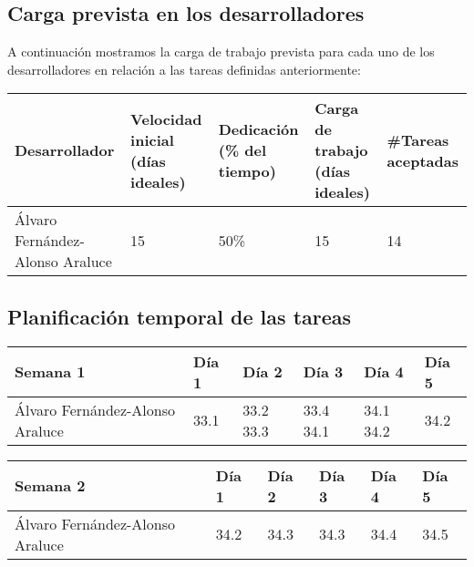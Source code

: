\newpage

\subsection{Carga prevista en los desarrolladores}

A continuación mostramos la carga de trabajo prevista para cada uno de los desarrolladores en relación a las tareas definidas anteriormente:

\begin{table}[h]
	\centering
	\begin{tabular}{| p{3cm} | p{2cm} | p{2cm} | p{2cm} | p{2cm} |}
		\rowcolor[HTML]{329A9D} 
		{\color[HTML]{FFFFFF} \textbf{Desarrollador}} & {\color[HTML]{FFFFFF} \textbf{Velocidad inicial (días ideales)}} & {\color[HTML]{FFFFFF} \textbf{Dedicación (\% del tiempo)}} & {\color[HTML]{FFFFFF} \textbf{Carga de trabajo (días ideales)}} & {\color[HTML]{FFFFFF} \textbf{\#Tareas aceptadas}}  \\ \hline
		Álvaro Fernández-Alonso Araluce & 15 & 50\% & 15 & 14 \\ \hline
	\end{tabular}
\end{table}

\subsection{Planificación temporal de las tareas}

\begin{table}[h]
	\centering
	\begin{tabular}{| p{2cm} | p{2cm} | p{2cm} | p{2cm} | p{2cm} | p{2cm} |}
		\rowcolor[HTML]{329A9D} 
		{\color[HTML]{FFFFFF} \textbf{Semana 1}} & {\color[HTML]{FFFFFF} \textbf{Día 1}} & {\color[HTML]{FFFFFF} \textbf{Día 2}} & {\color[HTML]{FFFFFF} \textbf{Día 3}} & {\color[HTML]{FFFFFF} \textbf{Día 4}}  & {\color[HTML]{FFFFFF} \textbf{Día 5}} \\ \hline
		Álvaro Fernández-Alonso Araluce & 33.1 & 33.2 33.3 & 33.4 34.1 & 34.1 34.2 & 34.2 \\ \hline
	\end{tabular}
\end{table}

\begin{table}[h]
	\centering
	\begin{tabular}{| p{2cm} | p{2cm} | p{2cm} | p{2cm} | p{2cm} | p{2cm} |}
		\rowcolor[HTML]{329A9D} 
		{\color[HTML]{FFFFFF} \textbf{Semana 2}} & {\color[HTML]{FFFFFF} \textbf{Día 1}} & {\color[HTML]{FFFFFF} \textbf{Día 2}} & {\color[HTML]{FFFFFF} \textbf{Día 3}} & {\color[HTML]{FFFFFF} \textbf{Día 4}}  & {\color[HTML]{FFFFFF} \textbf{Día 5}} \\ \hline
		Álvaro Fernández-Alonso Araluce & 34.2 & 34.3 & 34.3 & 34.4 & 34.5 \\ \hline
	\end{tabular}
\end{table}

